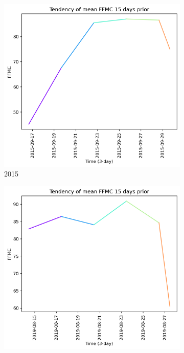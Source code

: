 \begin{figure}[h]
    \centering
    \caption{FFMC values 15 days prior to wildfire}
    \begin{subfigure}{0.3\textwidth}
        \centering
        \includegraphics[width=\textwidth]{graphs/15days/2015_15daysprior_tendency_graph_FFMC.png}
        \caption{2015}
        \label{fig:ffmc_prior_15_days_2015}
    \end{subfigure}
    \hfill
    \begin{subfigure}{0.3\textwidth}
        \centering
        \includegraphics[width=\textwidth]{graphs/15days/2019_15daysprior_tendency_graph_FFMC.png}

\end{subfigure}
\end{figure}
